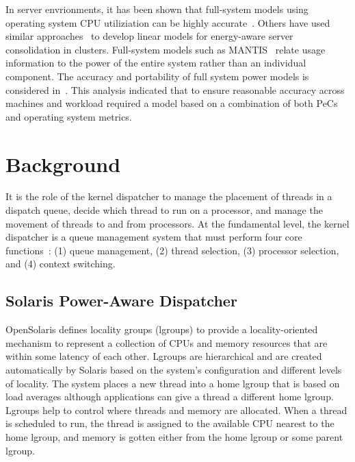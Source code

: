 \documentclass[]{sig-alternate-hotpower09}
\begin{document}
In server envrionments, it has been shown that full-system models
using operating system CPU utiliziation can be highly
accurate~\cite{Fan2007}. Others have used similar
approaches~\cite{Heath2005} to develop linear models for energy-aware
server consolidation in clusters.  Full-system models such as
MANTIS~\cite{Economou2006}\cite{Rivoire2008a} relate usage information
to the power of the entire system rather than an individual component.
The accuracy and portability of full system power models is considered
in~\cite{Rivoire2008b}.  This analysis indicated that to ensure
reasonable accuracy across machines and workload required a model based
on a combination of both PeCs and operating system metrics.
\section{Background}
\label{sec:background}
It is the role of the kernel dispatcher to manage the placement of
threads in a dispatch queue, decide which thread to run on a processor,
and manage the movement of threads to and from processors.   At the
fundamental level, the kernel dispatcher is a queue management system
that must perform four core functions~\cite{McDougall2007}: (1) queue
management, (2) thread selection, (3) processor selection, and (4)
context switching.
\subsection{Solaris Power-Aware Dispatcher}
\label{sec:solpad}
OpenSolaris defines locality groups (lgroups) to provide a
locality-oriented mechanism to represent a collection of CPUs and
memory resources that are within some latency of each other.
Lgroups are hierarchical and are created automatically by Solaris
based on the system’s conﬁguration and different levels of
locality. The system places a new thread into a home lgroup that
is based on load averages although applications can give a thread
a different home lgroup. Lgroups help to control where threads
and memory are allocated.  When a thread is scheduled to run, the
thread is assigned to the available CPU nearest to the home
lgroup, and memory is gotten either from the home lgroup or some
parent lgroup.
\end{document}

